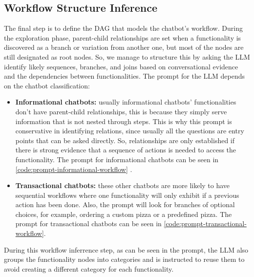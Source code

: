 \subsection{Workflow Structure Inference}

The final step is to define the \ac{DAG}
that models the chatbot's workflow.
During the exploration phase,
parent-child relationships are set
when a functionality is discovered as a branch or variation from another one,
but most of the nodes are still designated as root nodes.
So, we manage to structure this by asking the \ac{LLM}
identify likely sequences, branches, and joins
based on conversational evidence and the dependencies between functionalities.
The prompt for the LLM depends on the chatbot classification:

\begin{itemize}
  \item \textbf{Informational chatbots:}
    usually informational chatbots' functionalities
    don't have parent-child relationships,
    this is because they simply serve information that is not nested through steps.
    This is why this prompt is conservative in identifying relations,
    since usually all the questions are entry points
    that can be asked directly.
    So, relationships are only established
    if there is strong evidence that
    a sequence of actions is needed to access the functionality.
    The prompt for informational chatbots can be seen in
    \autoref{code:prompt-informational-workflow}
    .

  \item \textbf{Transactional chatbots:}
    these other chatbots are more likely to have sequential workflows
    where one functionality will only exhibit
    if a previous action has been done.
    Also, the prompt will look for branches of optional choices,
    for example, ordering a custom pizza or a predefined pizza.
    The prompt for transactional chatbots can be seen in \autoref{code:prompt-transactional-workflow}.
\end{itemize}

During this workflow inferrence step,
as can be seen in the prompt,
the \ac{LLM} also groups the functionality nodes into categories
and is instructed to reuse them
to avoid creating a different category for each functionality.



